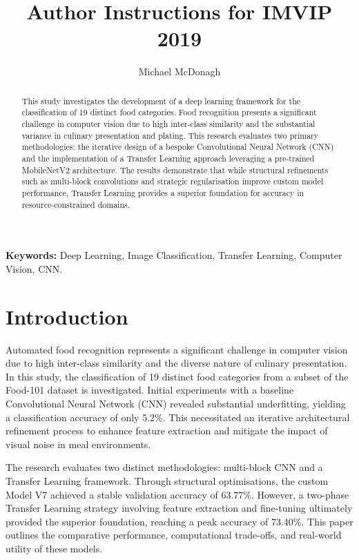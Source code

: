 \documentclass[a4paper,11pt]{article}
\begin{document}
\title{Author Instructions for IMVIP 2019}

\author{Michael McDonagh}
\date{}
\maketitle
\thispagestyle{empty}



\begin{abstract}
This study investigates the development of a deep learning framework for the classification of 19 distinct food categories. Food recognition presents a significant challenge in computer vision due to high inter-class similarity and the substantial variance in culinary presentation and plating. This research evaluates two primary methodologies: the iterative design of a bespoke Convolutional Neural Network (CNN) and the implementation of a Transfer Learning approach leveraging a pre-trained MobileNetV2 architecture. The results demonstrate that while structural refinements such as multi-block convolutions and strategic regularisation improve custom model performance, Transfer Learning provides a superior foundation for accuracy in resource-constrained domains.
\end{abstract}
\textbf{Keywords:} Deep Learning, Image Classification, Transfer Learning, Computer Vision, CNN.

\section{Introduction}

Automated food recognition represents a significant challenge in computer vision due to high inter-class similarity and the diverse nature of culinary presentation. In this study, the classification of 19 distinct food categories from a subset of the Food-101 dataset is investigated. Initial experiments with a baseline Convolutional Neural Network (CNN) revealed substantial underfitting, yielding a classification accuracy of only 5.2\%. This necessitated an iterative architectural refinement process to enhance feature extraction and mitigate the impact of visual noise in meal environments.

The research evaluates two distinct methodologies: multi-block CNN and a Transfer Learning framework. Through structural optimisations, the custom Model V7 achieved a stable validation accuracy of 63.77\%. However, a two-phase Transfer Learning strategy involving feature extraction and fine-tuning ultimately provided the superior foundation, reaching a peak accuracy of 73.40\%. This paper outlines the comparative performance, computational trade-offs, and real-world utility of these models.
\end{document}
